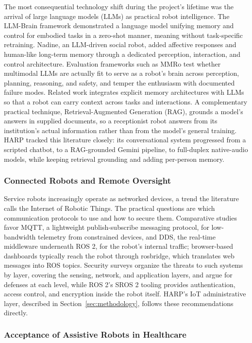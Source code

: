 \documentclass[11pt,a4paper]{article}
\begin{document}
The most consequential technology shift during the project's lifetime was the arrival of large language models (LLMs) as practical robot intelligence. The LLM-Brain framework demonstrated a language model unifying memory and control for embodied tasks in a zero-shot manner, meaning without task-specific retraining. Nadine, an LLM-driven social robot, added affective responses and human-like long-term memory through a dedicated perception, interaction, and control architecture. Evaluation frameworks such as MMRo test whether multimodal LLMs are actually fit to serve as a robot's brain across perception, planning, reasoning, and safety, and temper the enthusiasm with documented failure modes. Related work integrates explicit memory architectures with LLMs so that a robot can carry context across tasks and interactions. A complementary practical technique, Retrieval-Augmented Generation (RAG), grounds a model's answers in supplied documents, so a receptionist robot answers from its institution's actual information rather than from the model's general training. HARP tracked this literature closely: its conversational system progressed from a scripted chatbot, to a RAG-grounded Gemini pipeline, to full-duplex native-audio models, while keeping retrieval grounding and adding per-person memory.

\subsubsection{Connected Robots and Remote Oversight}

Service robots increasingly operate as networked devices, a trend the literature calls the Internet of Robotic Things. The practical questions are which communication protocols to use and how to secure them. Comparative studies favor MQTT, a lightweight publish-subscribe messaging protocol, for low-bandwidth telemetry from constrained devices, and DDS, the real-time middleware underneath ROS 2, for the robot's internal traffic; browser-based dashboards typically reach the robot through rosbridge, which translates web messages into ROS topics. Security surveys organize the threats to such systems by layer, covering the sensing, network, and application layers, and argue for defenses at each level, while ROS 2's SROS 2 tooling provides authentication, access control, and encryption inside the robot itself. HARP's IoT administrative layer, described in Section~\ref{sec:methodology}, follows these recommendations directly.

\subsubsection{Acceptance of Assistive Robots in Healthcare}
\end{document}
